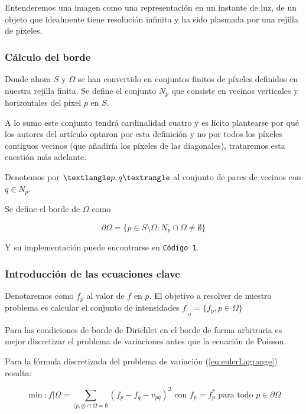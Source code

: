 \documentclass[11pt,twoside,titlepage,a4paper]{article}
\numberwithin{equation}{section} %
\theoremstyle{usual}
\begin{document}
Entenderemos una imagen como una representación en un instante de luz, de un objeto que idealmente tiene resolución infinita y ha sido plasmada por una rejilla de píxeles. 

\subsubsection{Cálculo del borde}

Donde ahora $S$ y $\Omega$ se han convertido en conjuntos finitos de píxeles definidos en nuestra rejilla finita.   
Se define el conjunto $N_p$ que consiste en vecinos verticales y horizontales del píxel $p$ en $S$.

A lo sumo este conjunto tendrá cardinalidad cuatro y es lícito plantearse por qué los autores del artículo \cite{poissonImageEditing} optaron por esta definición y no por todos los píxeles contiguos vecinos (que añadiría los píxeles de las diagonales), trataremos esta cuestión más adelante.  

Denotemos por $\textlangle p, q \textrangle$ al conjunto de pares de vecinos con $q \in N_p$.  

Se define el borde de $\Omega$ como 

\begin{equation} \label{def:bordeDiscreto}
    \partial\Omega = \{ p \in S \setminus \Omega : N_p \cap \Omega \neq  \emptyset \}
\end{equation}

Y su implementación puede encontrarse en \texttt{Código 1}.

\subsubsection{Introducción de las ecuaciones clave} 
Denotaremos como $f_p$ al valor de $f$ en $p$. El objetivo a resolver de nuestro problema es 
calcular el conjunto de intensidades $f_{|_{\Omega}} = \{ f_p, p \in \Omega\}$

Para las condiciones de borde de Dirichlet en el borde de forma arbitraria es mejor 
discretizar el problema de variaciones antes que la ecuación de Poisson.

Para la fórmula discretizada del problema de variación (\ref{eq:eulerLagrange}) resulta: 

\begin{equation}\label{eq:discretizada}
    \min: { f|\Omega} = \sum_{ \langle p,q\rangle \cap \Omega = \emptyset} (f_p - f_q - v_{pq})^2 \text{ con } f_p = f^*_p \text{ para todo } p \in \partial \Omega
\end{equation}
\end{document}

